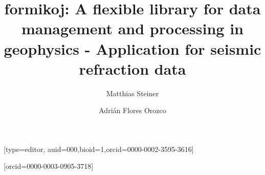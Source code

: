 \documentclass[a4paper,fleqn]{cas-sc}
\providecommand{\DIFaddbegin}{} %
\providecommand{\DIFaddend}{} %
\providecommand{\DIFdelbegin}{} %
\providecommand{\DIFdelend}{} %
\newcommand{\DIFscaledelfig}{0.5}
\newlength{\DIFdelgraphicswidth} %
\newlength{\DIFdelgraphicsheight} %
\newcommand{\DIFaddincludegraphics}[2][]{{\color{blue}\fbox{\DIFOincludegraphics[#1]{#2}}}} %
\newcommand{\DIFdelincludegraphics}[2][]{%
\sbox{\DIFdelgraphicsbox}{\DIFOincludegraphics[#1]{#2}}%
\settoboxwidth{\DIFdelgraphicswidth}{\DIFdelgraphicsbox} %
\settoboxtotalheight{\DIFdelgraphicsheight}{\DIFdelgraphicsbox} %
\scalebox{\DIFscaledelfig}{%
\parbox[b]{\DIFdelgraphicswidth}{\usebox{\DIFdelgraphicsbox}\\[-\baselineskip] \rule{\DIFdelgraphicswidth}{0em}}\llap{\resizebox{\DIFdelgraphicswidth}{\DIFdelgraphicsheight}{%
\setlength{\unitlength}{\DIFdelgraphicswidth}%
\begin{picture}(1,1)%
\thicklines\linethickness{2pt} %
{\color[rgb]{1,0,0}\put(0,0){\framebox(1,1){}}}%
{\color[rgb]{1,0,0}\put(0,0){\line( 1,1){1}}}%
{\color[rgb]{1,0,0}\put(0,1){\line(1,-1){1}}}%
\end{picture}%
}\hspace*{3pt}}} %
} %
\DeclareRobustCommand{\DIFaddbegin}{\DIFOaddbegin \let\includegraphics\DIFaddincludegraphics} %
\DeclareRobustCommand{\DIFaddend}{\DIFOaddend \let\includegraphics\DIFOincludegraphics} %
\DeclareRobustCommand{\DIFdelbegin}{\DIFOdelbegin \let\includegraphics\DIFdelincludegraphics} %
\DeclareRobustCommand{\DIFdelend}{\DIFOaddend \let\includegraphics\DIFOincludegraphics} %
\begin{document}
\let\WriteBookmarks\relax
\def\floatpagepagefraction{1}
\def\textpagefraction{.001}

\title [mode = title]{formikoj: A flexible library for data management and processing in geophysics - Application for seismic refraction data}


\author[1]{Matthias Steiner}[type=editor,
                        auid=000,bioid=1,orcid=0000-0002-3595-3616]
\cormark[1]

\author[1]{Adrián {Flores Orozco}}[orcid=0000-0003-0905-3718] 

\DIFdelbegin %
\DIFdelend \DIFaddbegin \address[1]{Research Unit of Geophysics, Department of Geodesy and Geoinformation, TU Wien}
\DIFaddend 
\end{document}
